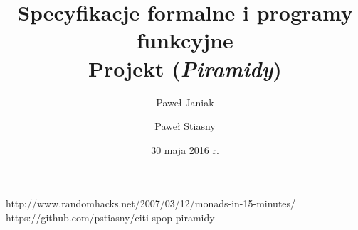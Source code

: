 \documentclass[10pt,twocolumn]{article}
\title{\textbf{Specyfikacje formalne i programy funkcyjne}
\\Projekt (\textit{Piramidy})}
\author{Paweł Janiak \and Paweł Stiasny}
\date{30 maja 2016 r.}
\begin{document}
\maketitle







\renewcommand\refname{Odnośniki}
\begin{thebibliography}{9}
        http://www.randomhacks.net/2007/03/12/monads-in-15-minutes/
        https://github.com/pstiasny/eiti-spop-piramidy
\end{thebibliography}
\end{document}
